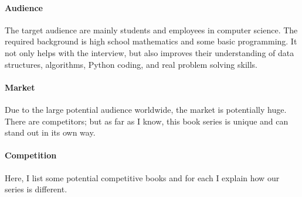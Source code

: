 \documentclass[12pt]{article}
\begin{document}
\paragraph{Audience} The target audience are mainly students and employees in computer science. The required background is high school mathematics and some basic programming. 
It not only helps with the interview, but also improves their understanding of data structures, algorithms, Python coding, and real problem solving skills. 

\paragraph{Market} Due to the large potential audience worldwide, the market is potentially huge. There are competitors; but as far as I know, this book series is unique and can stand out in its own way. 

\paragraph{Competition} Here, I list some potential competitive books and for each I explain how our series is different. 
\end{document}
